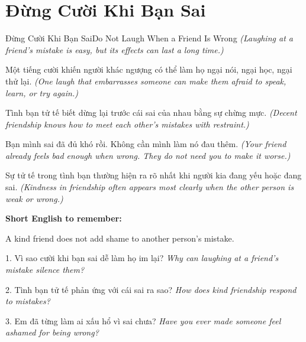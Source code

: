 \section{Đừng Cười Khi Bạn Sai}
\begin{truyen}{Đừng Cười Khi Bạn Sai}{Do Not Laugh When a Friend Is Wrong}
\textit{(Laughing at a friend's mistake is easy, but its effects can last a long time.)}

Một tiếng cười khiến người khác ngượng có thể làm họ ngại nói, ngại học, ngại thử lại.
\textit{(One laugh that embarrasses someone can make them afraid to speak, learn, or try again.)}

Tình bạn tử tế biết dừng lại trước cái sai của nhau bằng sự chừng mực.
\textit{(Decent friendship knows how to meet each other's mistakes with restraint.)}

Bạn mình sai đã đủ khó rồi. Không cần mình làm nó đau thêm.
\textit{(Your friend already feels bad enough when wrong. They do not need you to make it worse.)}
\end{truyen}

\begin{baihoc}
Sự tử tế trong tình bạn thường hiện ra rõ nhất khi người kia đang yếu hoặc đang sai.
\textit{(Kindness in friendship often appears most clearly when the other person is weak or wrong.)}
\end{baihoc}

\begin{ghinhoanh}
\textbf{Short English to remember:}

A kind friend does not add shame to another person's mistake.

\end{ghinhoanh}

\begin{tuhocnhanh}
1. Vì sao cười khi bạn sai dễ làm họ im lại? \textit{Why can laughing at a friend's mistake silence them?}

2. Tình bạn tử tế phản ứng với cái sai ra sao? \textit{How does kind friendship respond to mistakes?}

3. Em đã từng làm ai xấu hổ vì sai chưa? \textit{Have you ever made someone feel ashamed for being wrong?}
\end{tuhocnhanh}
\ngancach

